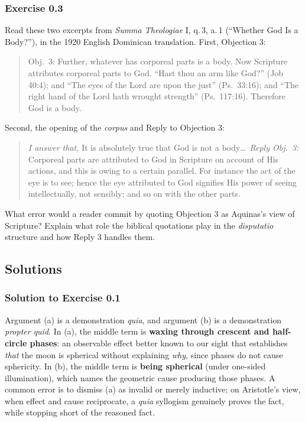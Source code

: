 \subsubsection*{Exercise 0.3}
Read these two excerpts from \emph{Summa Theologiae} I, q.\,3, a.\,1 (``Whether God Is a Body?''), in the 1920 English Dominican translation. First, Objection 3:

\begin{quote}
Obj.\ 3: Further, whatever has corporeal parts is a body. Now Scripture attributes corporeal parts to God. ``Hast thou an arm like God?'' (Job 40:4); and ``The eyes of the Lord are upon the just'' (Ps.\ 33:16); and ``The right hand of the Lord hath wrought strength'' (Ps.\ 117:16). Therefore God is a body.
\end{quote}

Second, the opening of the \emph{corpus} and Reply to Objection 3:

\begin{quote}
\emph{I answer that,} It is absolutely true that God is not a body\dots\ \emph{Reply Obj.\ 3:} Corporeal parts are attributed to God in Scripture on account of His actions, and this is owing to a certain parallel. For instance the act of the eye is to see; hence the eye attributed to God signifies His power of seeing intellectually, not sensibly; and so on with the other parts.
\end{quote}

What error would a reader commit by quoting Objection 3 as Aquinas's view of Scripture? Explain what role the biblical quotations play in the \emph{disputatio} structure and how Reply 3 handles them.

\subsection{Solutions}

\subsubsection*{Solution to Exercise 0.1}
Argument (a) is a demonstration \emph{quia}, and argument (b) is a demonstration \emph{propter quid}. In (a), the middle term is \textbf{waxing through crescent and half-circle phases}: an observable effect better known to our sight that establishes \emph{that} the moon is spherical without explaining \emph{why}, since phases do not cause sphericity. In (b), the middle term is \textbf{being spherical} (under one-sided illumination), which names the geometric cause producing those phases. A common error is to dismiss (a) as invalid or merely inductive; on Aristotle's view, when effect and cause reciprocate, a \emph{quia} syllogism genuinely proves the fact, while stopping short of the reasoned fact.

